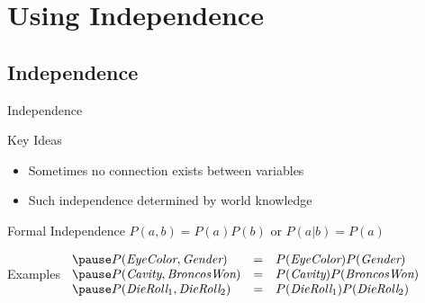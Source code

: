 \documentclass[14pt]{beamer}
\begin{document}
\section{Using Independence}
\subsection{Independence}
\begin{frame}{Independence}
	\begin{block}{Key Ideas}
		\begin{itemize}
			\item Sometimes no connection exists between variables
			\pause
			\item Such independence determined by world knowledge
		\end{itemize}
	\end{block}
	\pause
	\begin{block}{Formal Independence}
		$P(a, b) = P(a)P(b)$ \tab or \tab $P(a|b) = P(a)$
	\end{block}
	\pause
	\begin{block}{Examples}
		$
		\begin{array}{lll}
			\pause
			P(\textit{EyeColor},\textit{Gender}) & = & P(\textit{EyeColor})P(\textit{Gender}) \\
			\pause
			P(\textit{Cavity},\textit{BroncosWon}) & = & P(\textit{Cavity})P(\textit{BroncosWon}) \\
			\pause
			P(\textit{DieRoll}_{1},\textit{DieRoll}_{2}) & = & P(\textit{DieRoll}_{1})P(\textit{DieRoll}_{2}) \\
		\end{array}
		$
	\end{block}
\end{frame}
\end{document}
